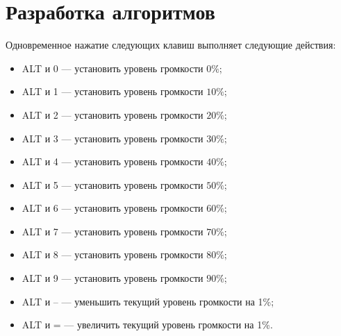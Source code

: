 \section{Разработка алгоритмов}

Одновременное нажатие следующих клавиш выполняет следующие действия:
\begin{itemize}
    \item ALT и 0 --- установить уровень громкости $0\%$; 
    \item ALT и 1 --- установить уровень громкости $10\%$; 
    \item ALT и 2 --- установить уровень громкости $20\%$; 
    \item ALT и 3 --- установить уровень громкости $30\%$; 
    \item ALT и 4 --- установить уровень громкости $40\%$; 
    \item ALT и 5 --- установить уровень громкости $50\%$; 
    \item ALT и 6 --- установить уровень громкости $60\%$; 
    \item ALT и 7 --- установить уровень громкости $70\%$; 
    \item ALT и 8 --- установить уровень громкости $80\%$; 
    \item ALT и 9 --- установить уровень громкости $90\%$; 
    \item ALT и -- --- уменьшить текущий уровень громкости на 1\%;
    \item ALT и = --- увеличить текущий уровень громкости на 1\%.     
\end{itemize}

